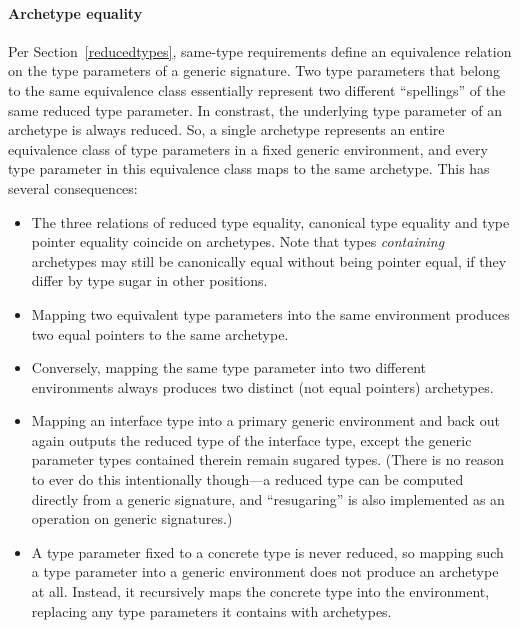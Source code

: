 \documentclass[../generics]{subfiles}
\begin{document}
\paragraph{Archetype equality} Per Section~\ref{reducedtypes}, same-type requirements define an equivalence relation on the type parameters of a generic signature. Two type parameters that belong to the same equivalence class essentially represent two different ``spellings'' of the same reduced type parameter. In constrast, the underlying type parameter of an archetype is always reduced. So, a single archetype represents an entire equivalence class of type parameters in a fixed generic environment, and every type parameter in this equivalence class maps to the same archetype. This has several consequences:
\begin{itemize}
\item The three relations of reduced type equality, canonical type equality and type pointer equality coincide on archetypes. Note that types \emph{containing} archetypes may still be canonically equal without being pointer equal, if they differ by type sugar in other positions.

\item Mapping two equivalent type parameters into the same environment produces two equal pointers to the same archetype.

\item Conversely, mapping the same type parameter into two different environments always produces two distinct (not equal pointers) archetypes.

\item Mapping an interface type into a primary generic environment and back out again outputs the reduced type of the interface type, except the generic parameter types contained therein remain sugared types. (There is no reason to ever do this intentionally though---a reduced type can be computed directly from a generic signature, and ``resugaring'' is also implemented as an operation on generic signatures.)

\item A type parameter fixed to a concrete type is never reduced, so mapping such a type parameter into a generic environment does not produce an archetype at all. Instead, it recursively maps the concrete type into the environment, replacing any type parameters it contains with archetypes.
\end{itemize}
\end{document}
